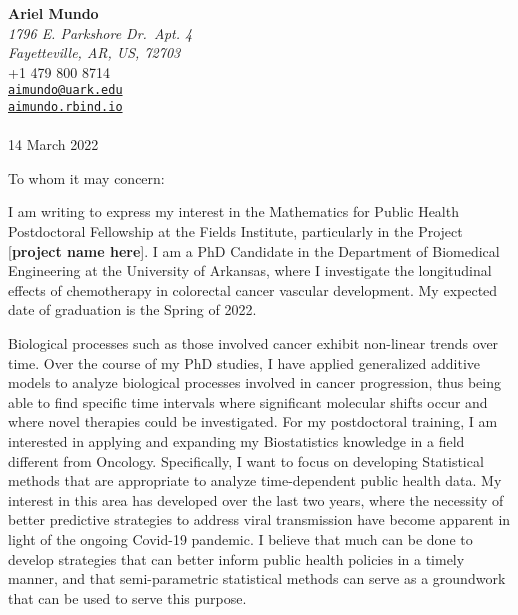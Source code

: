 \documentclass[
  11pt,
]{article}
\author{Ariel Mundo}
\date{14 March 2022}
\date{}
\begin{document}
\hfill
\begin{minipage}[t]{1\textwidth}
\raggedleft%
{\bfseries Ariel Mundo }\\[.35ex]
\emph{\small 1796 E. Parkshore Dr.~Apt. 4\\
Fayetteville, AR, US, 72703} \\[.35ex]
\faPhone \hspace{1 mm} \small{+1 479 800 8714} \\ 
\faEnvelopeO \hspace{1 mm} \small{\tt \href{mailto:aimundo@uark.edu}{\nolinkurl{aimundo@uark.edu}}} \\ 
\faGlobe \hspace{1 mm} \small{\href{http://aimundo.rbind.io}{\tt aimundo.rbind.io}}\\ 
\hspace{1cm} \\
 14 March 2022 \\ 
\end{minipage}


\vspace*{1em}

To whom it may concern:

\vspace*{1em}

 

% 
% 

% 
I am writing to express my interest in the Mathematics for Public Health
Postdoctoral Fellowship at the Fields Institute, particularly in the
Project {[}\textbf{project name here}{]}. I am a PhD Candidate in the
Department of Biomedical Engineering at the University of Arkansas,
where I investigate the longitudinal effects of chemotherapy in
colorectal cancer vascular development. My expected date of graduation
is the Spring of 2022.

Biological processes such as those involved cancer exhibit non-linear
trends over time. Over the course of my PhD studies, I have applied
generalized additive models to analyze biological processes involved in
cancer progression, thus being able to find specific time intervals
where significant molecular shifts occur and where novel therapies could
be investigated. For my postdoctoral training, I am interested in
applying and expanding my Biostatistics knowledge in a field different
from Oncology. Specifically, I want to focus on developing Statistical
methods that are appropriate to analyze time-dependent public health
data. My interest in this area has developed over the last two years,
where the necessity of better predictive strategies to address viral
transmission have become apparent in light of the ongoing Covid-19
pandemic. I believe that much can be done to develop strategies that can
better inform public health policies in a timely manner, and that
semi-parametric statistical methods can serve as a groundwork that can
be used to serve this purpose.
\end{document}
